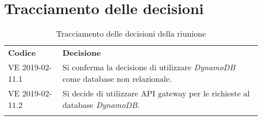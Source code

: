 \clearpage
\section{Tracciamento delle decisioni}
\begin{center}
	\renewcommand{\arraystretch}{1.5}
	\begin{longtable}{  p{2.8cm} p{11.4cm} }
		\rowcolor{tableHeadYellow}
		\textbf{Codice}&\textbf{Decisione}\\
		VE 2019-02-11.1 & Si conferma la decisione di utilizzare \textit{DynamoDB} come database non relazionale.\\
		VE 2019-02-11.2 & Si decide di utilizzare API gateway per le richieste al database \textit{DynamoDB}.\\
		\rowcolor{white}
		\caption{Tracciamento delle decisioni della riunione}
	\end{longtable}	
\end{center}